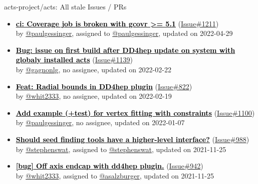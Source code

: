 \begin{frame}[allowframebreaks]{ acts-project/acts: All stale Issues / PRs}
\begin{itemize}
    \item
    \textbf{\href{https://github.com/acts-project/acts/issues/1211}{\textcolor{black}{ci: Coverage job is broken with gcovr >= 5.1}}}
    (\href{https://github.com/acts-project/acts/issues/1211}{Issue\#1211}) \\
    by \href{https://github.com/paulgessinger}{@paulgessinger}, {}assigned to \href{https://github.com/paulgessinger}{@paulgessinger}, updated on 2022-04-29

    \item
    \textbf{\href{https://github.com/acts-project/acts/issues/1139}{\textcolor{black}{Bug: issue on first build after DD4hep update on system with globaly installed acts}}}
    (\href{https://github.com/acts-project/acts/issues/1139}{Issue\#1139}) \\
    by \href{https://github.com/gagnonlg}{@gagnonlg}, {}no assignee, updated on 2022-02-22

    \item
    \textbf{\href{https://github.com/acts-project/acts/issues/822}{\textcolor{black}{Feat: Radial bounds in DD4hep plugin}}}
    (\href{https://github.com/acts-project/acts/issues/822}{Issue\#822}) \\
    by \href{https://github.com/whit2333}{@whit2333}, {}no assignee, updated on 2022-02-19

    \item
    \textbf{\href{https://github.com/acts-project/acts/issues/1100}{\textcolor{black}{Add example (+test) for vertex fitting with constraints}}}
    (\href{https://github.com/acts-project/acts/issues/1100}{Issue\#1100}) \\
    by \href{https://github.com/paulgessinger}{@paulgessinger}, {}no assignee, updated on 2022-01-07

    \item
    \textbf{\href{https://github.com/acts-project/acts/issues/988}{\textcolor{black}{Should seed finding tools have a higher-level interface?}}}
    (\href{https://github.com/acts-project/acts/issues/988}{Issue\#988}) \\
    by \href{https://github.com/stephenswat}{@stephenswat}, {}assigned to \href{https://github.com/stephenswat}{@stephenswat}, updated on 2021-11-25

    \item
    \textbf{\href{https://github.com/acts-project/acts/issues/942}{\textcolor{black}{[bug] Off axis endcap with dd4hep plugin.}}}
    (\href{https://github.com/acts-project/acts/issues/942}{Issue\#942}) \\
    by \href{https://github.com/whit2333}{@whit2333}, {}assigned to \href{https://github.com/asalzburger}{@asalzburger}, updated on 2021-11-25


\end{itemize}
\end{frame}

